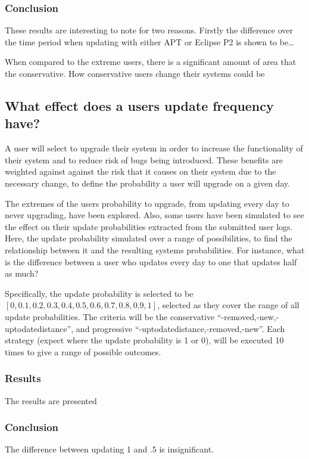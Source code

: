 \subsubsection{Conclusion}
These results are interesting to note for two reasons. 
Firstly the difference over the time period when updating with either APT or Eclipse P2 is shown to be\ldots

When compared to the extreme users, there is a significant amount of area that the conservative.
How conservative users change their systems could be 

\subsection{What effect does a users update frequency have?}
A user will select to upgrade their system in order to increase the functionality of their system and to reduce risk of bugs being introduced.
These benefits are weighted against against the risk that it causes on their system due to the necessary change, to define the probability a user will upgrade on a given day.

The extremes of the users probability to upgrade, from updating every day to never upgrading, have been explored.
Also, some users have been simulated to see the effect on their update probabilities extracted from the submitted user logs.
Here, the update probability simulated over a range of possibilities, to find the relationship between it and the resulting systems probabilities.
For instance, what is the difference between a user who updates every day to one that updates half as much?

Specifically, the update probability is selected to be $[0,0.1,0.2,0.3,0.4,0.5,0.6,0.7,0.8,0.9,1]$,
selected as they cover the range of all update probabilities.  
The criteria will be the conservative ``-removed,-new,-uptodatedistance'', and progressive ``-uptodatedistance,-removed,-new''.
Each strategy (expect where the update probability is 1 or 0), will be executed 10 times to give a range of possible outcomes.

\subsubsection{Results}
The results are presented

\subsubsection{Conclusion}
The difference between updating 1 and .5 is insignificant. 

